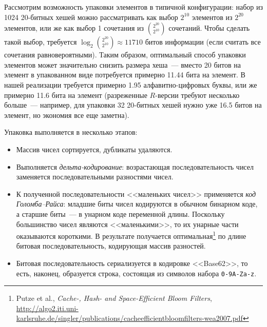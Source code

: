 \documentclass[russian,a4paper,12pt,titlepage]{article}
\begin{document}
Рассмотрим возможность упаковки элементов в типичной конфигурации: набор из 1024 20-битных хешей можно рассматривать
как выбор $2^{10}$ элементов из $2^{20}$ элементов, или же как выбор 1 сочетания из ${2^{20}\choose2^{10}}$ сочетаний.
Чтобы сделать такой выбор, требуется $\log_2{{2^{20}}\choose{2^{10}}}\approx11710$ битов информации (если считать
все сочетания равновероятными).  Таким образом, оптимальный способ упаковки элементов может значительно снизить размера хеша~---
вместо 20 битов на элемент в упакованном виде потребуется примерно 11.44 бита на элемент.
В нашей реализации требуется примерно 1.95 алфавитно-цифровых буквы, или же примерно 11.6 бита на элемент
(разреженные $R$-версии требуют несколько больше~--- например, для упаковки 32 20-битных хешей нужно уже 16.5 битов на элемент,
но экономия все еще заметна).

Упаковка выполняется в несколько этапов:
\begin{itemize}
\item Массив чисел сортируется, дубликаты удаляются.
\item Выполняется \emph{дельта-кодирование}: возрастающая последовательность чисел заменяется
последовательными разностями чисел.
\item К полученной последовательности <<маленьких чисел>> применяется \emph{код Голомба--Райса}:
младшие биты чисел кодируются в обычном бинарном коде, а старшие биты~--- в унарном
коде переменной длины.  Поскольку большинство чисел являются <<маленькими>>, то их унарные
части оказываются короткими.  В результате получается оптимальная\footnote{ Putze et al.,
\emph{Cache-, Hash- and Space-Efficient Bloom Filters},
\url{http://algo2.iti.uni-karlsruhe.de/singler/publications/cacheefficientbloomfilters-wea2007.pdf}}
по длине битовая последовательность, кодирующая массив разностей.
\item Битовая последовательность сериализуется в кодировке <<Base62>>,
то есть, наконец, образуется строка, состоящая из символов набора \verb|0-9A-Za-z|.
\end{itemize}
\end{document}
